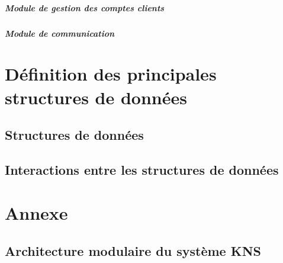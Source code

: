 \documentclass[10pt,a4paper]{report}
\begin{document}
	
				\subparagraph{Module de gestion des comptes clients}
	
	
				\subparagraph{Module de communication}

\section{Définition des principales structures de données}

	\subsection{Structures de données}

	\subsection{Interactions entre les structures de données} %

\newpage
\section{Annexe}

\subsection{Architecture modulaire du système KNS}
	\begin{center}
	\end{center}
\end{document}
